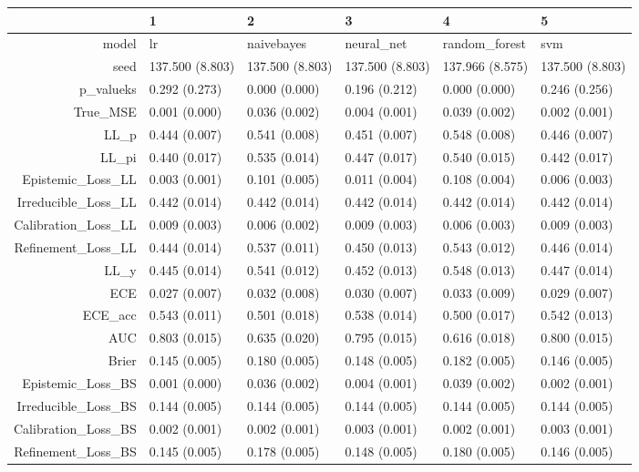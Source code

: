 \begin{table}[ht]
\centering
\begin{tabular}{rlllll}
  \hline
 & 1 & 2 & 3 & 4 & 5 \\ 
  \hline
model & lr & naivebayes & neural\_net & random\_forest & svm \\ 
  seed & 137.500 (8.803) & 137.500 (8.803) & 137.500 (8.803) & 137.966 (8.575) & 137.500 (8.803) \\ 
  p\_valueks & 0.292 (0.273) & 0.000 (0.000) & 0.196 (0.212) & 0.000 (0.000) & 0.246 (0.256) \\ 
  True\_MSE & 0.001 (0.000) & 0.036 (0.002) & 0.004 (0.001) & 0.039 (0.002) & 0.002 (0.001) \\ 
  LL\_p & 0.444 (0.007) & 0.541 (0.008) & 0.451 (0.007) & 0.548 (0.008) & 0.446 (0.007) \\ 
  LL\_pi & 0.440 (0.017) & 0.535 (0.014) & 0.447 (0.017) & 0.540 (0.015) & 0.442 (0.017) \\ 
  Epistemic\_Loss\_LL & 0.003 (0.001) & 0.101 (0.005) & 0.011 (0.004) & 0.108 (0.004) & 0.006 (0.003) \\ 
  Irreducible\_Loss\_LL & 0.442 (0.014) & 0.442 (0.014) & 0.442 (0.014) & 0.442 (0.014) & 0.442 (0.014) \\ 
  Calibration\_Loss\_LL & 0.009 (0.003) & 0.006 (0.002) & 0.009 (0.003) & 0.006 (0.003) & 0.009 (0.003) \\ 
  Refinement\_Loss\_LL & 0.444 (0.014) & 0.537 (0.011) & 0.450 (0.013) & 0.543 (0.012) & 0.446 (0.014) \\ 
  LL\_y & 0.445 (0.014) & 0.541 (0.012) & 0.452 (0.013) & 0.548 (0.013) & 0.447 (0.014) \\ 
  ECE & 0.027 (0.007) & 0.032 (0.008) & 0.030 (0.007) & 0.033 (0.009) & 0.029 (0.007) \\ 
  ECE\_acc & 0.543 (0.011) & 0.501 (0.018) & 0.538 (0.014) & 0.500 (0.017) & 0.542 (0.013) \\ 
  AUC & 0.803 (0.015) & 0.635 (0.020) & 0.795 (0.015) & 0.616 (0.018) & 0.800 (0.015) \\ 
  Brier & 0.145 (0.005) & 0.180 (0.005) & 0.148 (0.005) & 0.182 (0.005) & 0.146 (0.005) \\ 
  Epistemic\_Loss\_BS & 0.001 (0.000) & 0.036 (0.002) & 0.004 (0.001) & 0.039 (0.002) & 0.002 (0.001) \\ 
  Irreducible\_Loss\_BS & 0.144 (0.005) & 0.144 (0.005) & 0.144 (0.005) & 0.144 (0.005) & 0.144 (0.005) \\ 
  Calibration\_Loss\_BS & 0.002 (0.001) & 0.002 (0.001) & 0.003 (0.001) & 0.002 (0.001) & 0.003 (0.001) \\ 
  Refinement\_Loss\_BS & 0.145 (0.005) & 0.178 (0.005) & 0.148 (0.005) & 0.180 (0.005) & 0.146 (0.005) \\ 
   \hline
\end{tabular}
\end{table}
